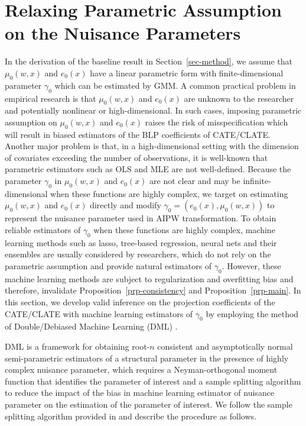 \documentclass[
  12pt,
  12pt]{article}
\numberwithin{equation}{section}
\theoremstyle{definition}
\theoremstyle{plain}
\theoremstyle{plain}
\theoremstyle{remark}
\begin{document}
\section{Relaxing Parametric Assumption on the Nuisance
Parameters}\label{sec-extend}

In the derivation of the baseline result in Section~\ref{sec-method}, we
assume that \(\mu_0(w, x)\) and \(e_0(x)\) have a linear parametric form
with finite-dimensional parameter \(\gamma_0\) which can be estimated by
GMM. A common practical problem in empirical research is that
\(\mu_0(w, x)\) and \(e_0(x)\) are unknown to the researcher and
potentially nonlinear or high-dimensional. In such cases, imposing
parametric assumption on \(\mu_0(w, x)\) and \(e_0(x)\) raises the risk
of misspecification which will result in biased estimators of the BLP
coefficients of CATE/CLATE. Another major problem is that, in a
high-dimensional setting with the dimension of covariates exceeding the
number of observations, it is well-known that parametric estimators such
as OLS and MLE are not well-defined. Because the parameter \(\gamma_0\)
in \(\mu_0(w, x)\) and \(e_0(x)\) are not clear and may be
infinite-dimensional when these functions are highly complex, we target
on estimating \(\mu_0(w, x)\) and \(e_0(x)\) directly and modify
\(\gamma_0 = (e_0(x), \mu_0(w, x))\) to represent the nuisance parameter
used in AIPW transformation. To obtain reliable estimators of
\(\gamma_0\) when these functions are highly complex, machine learning
methods such as lasso, tree-based regression, neural nets and their
ensembles are usually considered by researchers, which do not rely on
the parametric assumption and provide natural estimators of
\(\gamma_0\). However, these machine learning methods are subject to
regularization and overfitting bias and therefore, invalidate
Proposition~\ref{prp-consistency} and Proposition~\ref{prp-main}. In
this section, we develop valid inference on the projection coefficients
of the CATE/CLATE with machine learning estimators of \(\gamma_0\) by
employing the method of Double/Debiased Machine Learning (DML)
\citep{chernozhukov2018double}.

DML is a framework for obtaining root-\(n\) consistent and
asymptotically normal semi-parametric estimators of a structural
parameter in the presence of highly complex nuisance parameter, which
requires a Neyman-orthogonal moment function that identifies the
parameter of interest and a sample splitting algorithm to reduce the
impact of the bias in machine learning estimator of nuisance parameter
on the estimation of the parameter of interest. We follow the sample
splitting algorithm provided in \citet{chernozhukov2018double} and
describe the procedure as follows.
\end{document}
